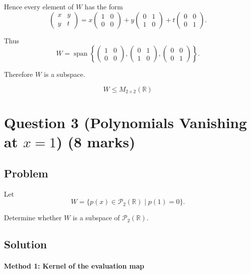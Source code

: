 \documentclass[12pt]{article}
\newcommand{\Span}{\operatorname{span}}
\begin{document}
Hence every element of \(W\) has the form
\[
\begin{pmatrix}x&y\\ y&t\end{pmatrix}
=
x\begin{pmatrix}1&0\\0&0\end{pmatrix}
+y\begin{pmatrix}0&1\\1&0\end{pmatrix}
+t\begin{pmatrix}0&0\\0&1\end{pmatrix}.
\]

Thus
\[
W=\Span\left\{
\begin{pmatrix}1&0\\0&0\end{pmatrix},
\begin{pmatrix}0&1\\1&0\end{pmatrix},
\begin{pmatrix}0&0\\0&1\end{pmatrix}
\right\}.
\]

Therefore \(W\) is a subspace.

\[
\boxed{W\le M_{2\times2}(\mathbb R)}
\]

\newpage
\section{Question 3 (Polynomials Vanishing at \(x=1\)) \hfill (8 marks)}
\subsection{Problem}

Let
\[
W=\{p(x)\in\mathcal P_2(\mathbb R)\mid p(1)=0\}.
\]

Determine whether \(W\) is a subspace of \(\mathcal P_2(\mathbb R)\).

\subsection{Solution}

\paragraph{Method 1: Kernel of the evaluation map}
\end{document}
